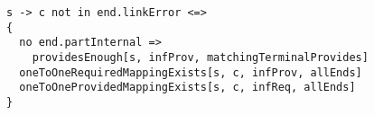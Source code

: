 \lstset{frame=tb, aboveskip=12pt, belowskip=-3pt, breaklines=true, basicstyle=\small\ttfamily, tabsize=2, mathescape=true}
\begin{lstlisting}[caption={bb\_port\_inference.als, lines 146-153}, label=alloy:connectionok, captionpos=b]
s -> c not in end.linkError <=>
{
  no end.partInternal =>
    providesEnough[s, infProv, matchingTerminalProvides]
  oneToOneRequiredMappingExists[s, c, infProv, allEnds]
  oneToOneProvidedMappingExists[s, c, infReq, allEnds]
}
\end{lstlisting}
